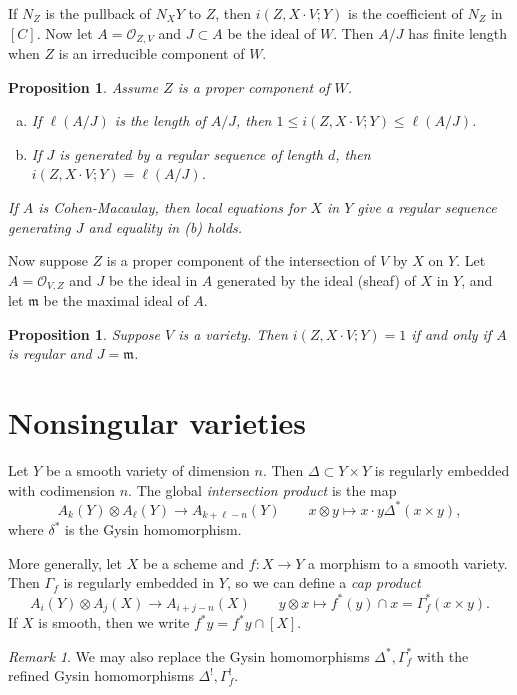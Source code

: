 \documentclass[leqno, openany]{memoir}
\newtheorem{prop}[thm]{Proposition}
\theoremstyle{definition}
\theoremstyle{remark}
\newtheorem{rmk}[thm]{Remark}
\theoremstyle{plain}
\theoremstyle{definition}
\theoremstyle{remark}
\newcommand{\mc}[1]{\mathcal{#1}}
\newcommand{\mf}[1]{\mathfrak{#1}}
\begin{document}
If $N_Z$ is the pullback of $N_X Y$ to $Z$, then $i(Z,X\cdot V; Y)$ is the
coefficient of $N_Z$ in $[C]$. Now let $A = \mc{O}_{Z,V}$ and $J \subset A$ be
the ideal of $W$. Then $A/J$ has finite length when $Z$ is an irreducible
component of $W$.

\begin{prop} Assume $Z$ is a proper component of $W$.  \begin{enumerate}[(a)]
    \item If $\ell(A/J)$ is the length of $A/J$, then $1 \leq i(Z, X \cdot V;
        Y) \leq \ell(A/J)$.  \item If $J$ is generated by a regular sequence of
        length $d$, then $i(Z, X \cdot V; Y) = \ell(A/J)$.  \end{enumerate} If
    $A$ is Cohen-Macaulay, then local equations for $X$ in $Y$ give a regular
sequence generating $J$ and equality in (b) holds.  \end{prop}

Now suppose $Z$ is a proper component of the intersection of $V$ by $X$ on $Y$.
Let $A = \mc{O}_{V,Z}$ and $J$ be the ideal in $A$ generated by the ideal
(sheaf) of $X$ in $Y$, and let $\mf{m}$ be the maximal ideal of $A$.

\begin{prop} Suppose $V$ is a variety. Then $i(Z, X \cdot V; Y) = 1$ if and
only if $A$ is regular and $J = \mf{m}$.  \end{prop}

\section{Nonsingular varieties}%

Let $Y$ be a smooth variety of dimension $n$. Then $\Delta \subset Y \times Y$
is regularly embedded with codimension $n$. The global \textit{intersection
product} is the map \[ A_k(Y) \otimes A_{\ell}(Y) \to A_{k+\ell-n}(Y) \qquad x
\otimes y \mapsto x \cdot y \Delta^*(x \times y), \] where $\delta^*$ is the
Gysin homomorphism.

More generally, let $X$ be a scheme and $f \colon X \to Y$ a morphism to a
smooth variety. Then $\Gamma_f$ is regularly embedded in $Y$, so we can define
a \textit{cap product} \[ A_i (Y) \otimes A_j (X) \to A_{i+j-n}(X) \qquad y
\otimes x \mapsto f^*(y) \cap x = \Gamma_f^*(x \times y). \] If $X$ is smooth,
then we write $f^*y = f^* y \cap [X]$.

\begin{rmk} We may also replace the Gysin homomorphisms $\Delta^*, \Gamma_f^*$
with the refined Gysin homomorphisms $\Delta^{!}, \Gamma_f^{!}$.  \end{rmk}
\end{document}

